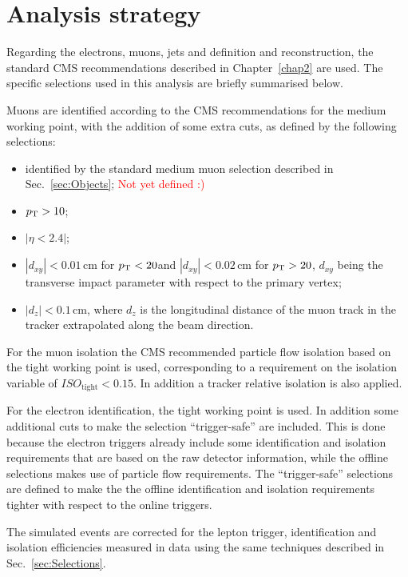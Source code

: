 \section{Analysis strategy}\label{chap5:analysis_strategy}

Regarding the electrons, muons, jets and \MET definition and reconstruction, the standard CMS recommendations described in Chapter~\ref{chap2} are used. The specific selections used in this analysis are briefly summarised below.

Muons are identified according to the CMS recommendations for the medium working point, with the addition of some extra cuts, as defined by the following selections:
\begin{itemize}
\item identified by the standard medium muon selection described in Sec.~\ref{sec:Objects}; \textcolor{red}{Not yet defined :)}
\item $p_\mathrm{T}> 10$\GeV;
\item $|\eta < 2.4|$;
\item $|d_{xy}| < 0.01$\,cm for $p_\mathrm{T} < 20$\GeV and $|d_{xy}| < 0.02$\,cm for $p_\mathrm{T} > 20$\GeV, $d_{xy}$ being the transverse impact parameter with respect to the primary vertex;
\item $|d_{z}| < 0.1$\,cm, where $d_z$ is the longitudinal distance of the muon track in the tracker extrapolated along the beam direction.
\end{itemize}

For the muon isolation the CMS recommended particle flow isolation based on the tight working point is used, corresponding to a requirement on the isolation variable of $ISO_\mathrm{tight} < 0.15$. In addition a tracker relative isolation is also applied.

For the electron identification, the tight working point is used. In addition some additional cuts to make the selection ``trigger-safe'' are included. This is done because the electron triggers already include some identification and isolation requirements that are based on the raw detector information, while the offline selections makes use of particle flow requirements. The ``trigger-safe'' selections are defined to make the the offline identification and isolation requirements tighter with respect to the online triggers.

The simulated events are corrected for the lepton trigger, identification and isolation efficiencies measured in data using the same techniques described in Sec.~\ref{sec:Selections}.

